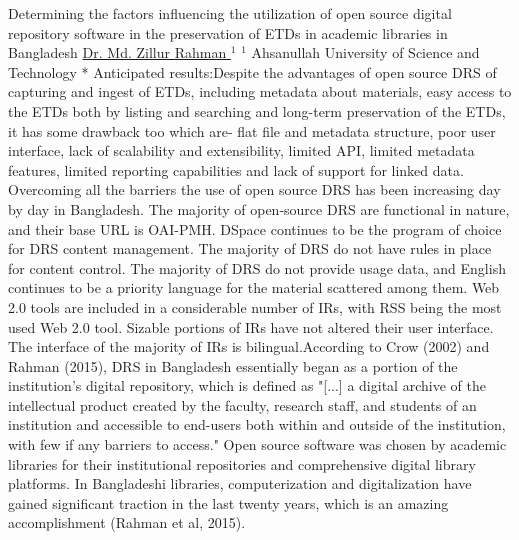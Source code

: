 \begin{abstract_online}{Determining the factors influencing the utilization of open source digital repository software in the preservation of ETDs in academic libraries in Bangladesh}{%
        \underline{ Dr. Md. Zillur Rahman }$^{1}$}{%
        }{%
        $^1$  Ahsanullah University of Science and Technology *\newline{}
            }
	Anticipated results:Despite the advantages of open source DRS of capturing and ingest of ETDs, including metadata about materials, easy access to the ETDs both by listing and searching and long-term preservation of the ETDs, it has some drawback too which are- flat file and metadata structure, poor user interface, lack of scalability and extensibility, limited API, limited metadata features, limited reporting capabilities and lack of support for linked data. Overcoming all the barriers the use of open source DRS has been increasing day by day in Bangladesh. The majority of open-source DRS are functional in nature, and their base URL is OAI-PMH. DSpace continues to be the program of choice for DRS content management. The majority of DRS do not have rules in place for content control. The majority of DRS do not provide usage data, and English continues to be a priority language for the material scattered among them. Web 2.0 tools are included in a considerable number of IRs, with RSS being the most used Web 2.0 tool. Sizable portions of IRs have not altered their user interface. The interface of the majority of IRs is bilingual.According to Crow (2002) and Rahman (2015), DRS in Bangladesh essentially began as a portion of the institution's digital repository, which is defined as "[...] a digital archive of the intellectual product created by the faculty, research staff, and students of an institution and accessible to end-users both within and outside of the institution, with few if any barriers to access." Open source software was chosen by academic libraries for their institutional repositories and comprehensive digital library platforms. In Bangladeshi libraries, computerization and digitalization have gained significant traction in the last twenty years, which is an amazing accomplishment (Rahman et al, 2015).  
    \end{abstract_online}
    
